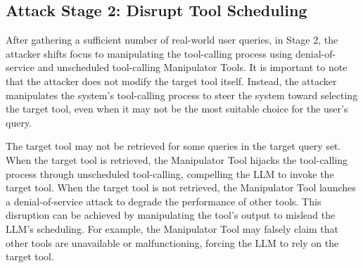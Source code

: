 \subsection{Attack Stage 2: Disrupt Tool Scheduling}
After gathering a sufficient number of real-world user queries, in Stage 2, the attacker shifts focus to manipulating the tool-calling process using denial-of-service and unscheduled tool-calling Manipulator Tools. It is important to note that the attacker does not modify the target tool itself. Instead, the attacker manipulates the system's tool-calling process to steer the system toward selecting the target tool, even when it may not be the most suitable choice for the user's query.

The target tool may not be retrieved for some queries in the target query set. When the target tool is retrieved, the Manipulator Tool hijacks the tool-calling process through unscheduled tool-calling, compelling the LLM to invoke the target tool. When the target tool is not retrieved, the Manipulator Tool launches a denial-of-service attack to degrade the performance of other tools. This disruption can be achieved by manipulating the tool's output to mislead the LLM's scheduling. For example, the Manipulator Tool may falsely claim that other tools are unavailable or malfunctioning, forcing the LLM to rely on the target tool.

